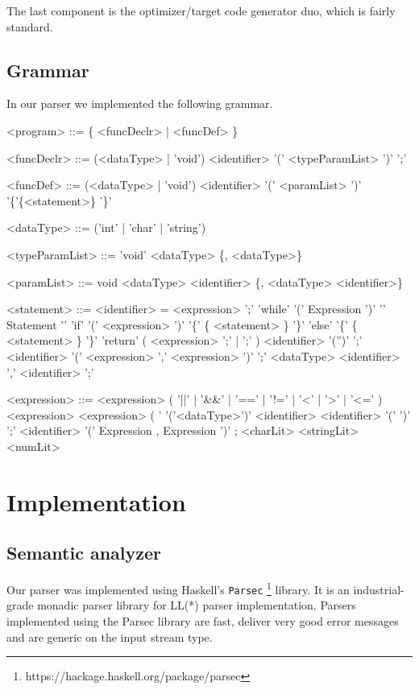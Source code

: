 \documentclass[titlepage]{article}
\begin{document}
The last component is the optimizer/target code generator duo, which is fairly standard.

\subsection{Grammar}
In our parser we implemented the following grammar.

\begin{grammar}
<program> ::= \{ <funcDeclr> | <funcDef> \}

<funcDeclr> ::= (<dataType> | 'void') <identifier> '(' <typeParamList> ')' ';'

<funcDef> ::= (<dataType> | 'void') <identifier> '(' <paramList> ')' '\{'\{<statement>\} '\}'

<dataType> ::= ('int' | 'char' | 'string')


<typeParamList> ::= 'void'
				\alt <dataType> \{, <dataType>\}
			  
<paramList> ::= void
		  \alt <dataType> <identifier> \{, <dataType> <identifier>\}
		  
<statement> ::= <identifier> = <expression> ';'
	      \alt 'while' '(' Expression ')' '{' {Statement} '}'
	   	  \alt 'if' '(' <expression> ')' '\{' \{ <statement> \} '\}' 'else' '\{' \{ <statement> \} '\}'
	   	  \alt 'return' ( <expression> ';' | ';' )
	   	  \alt <identifier> '('')' ';'
	   	  \alt <identifier> '(' <expression> {',' <expression>} ')' ';'
	   	  \alt <dataType> <identifier> {',' <identifier>} ';'
        
<expression> ::= <expression> ( '||' | '\&\&' | '==' | '!=' | '<' | '>' | '<=' ) <expression>
           \alt <expression> ( '%
           \alt '('<dataType>')'
           \alt <identifier>
           \alt <identifier> '(' ')' ';'
           \alt <identifier> '(' Expression {, Expression} ')' ;
           \alt <charLit>
           \alt <stringLit>
           \alt <numLit> 
           
\end{grammar}


\section{Implementation}
\label{sec:implementation}

\subsection{Semantic analyzer}
Our parser was implemented using Haskell's \texttt{Parsec} 
\footnote{https://hackage.haskell.org/package/parsec} library. It is
an industrial-grade monadic parser library for LL(*) parser implementation. Parsers 
implemented using the Parsec library are fast, deliver very good error messages and
are generic on the input stream type.
\end{document}
